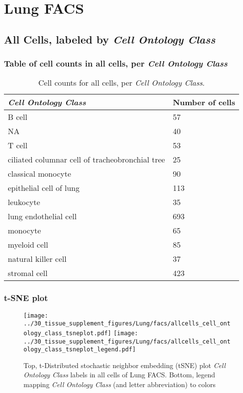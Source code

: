 \clearpage
\section{Lung FACS}

\subsection{All Cells, labeled by \emph{Cell Ontology Class}}
\subsubsection{Table of cell counts in all cells, per \emph{Cell Ontology Class}}\begin{table}[h]
\centering
\label{my-label}
\begin{tabular}{@{}ll@{}}
\toprule

\emph{Cell Ontology Class}& Number of cells \\ \midrule
B cell & 57 \\

NA & 40 \\

T cell & 53 \\

ciliated columnar cell of tracheobronchial tree & 25 \\

classical monocyte & 90 \\

epithelial cell of lung & 113 \\

leukocyte & 35 \\

lung endothelial cell & 693 \\

monocyte & 65 \\

myeloid cell & 85 \\

natural killer cell & 37 \\

stromal cell & 423 \\
\bottomrule
\end{tabular}
\caption{Cell counts for all cells, per \emph{Cell Ontology Class}.}
\end{table}

\clearpage
\subsubsection{t-SNE plot}
\begin{figure}[h]
\centering
\texttt{[image: ../30\_tissue\_supplement\_figures/Lung/facs/allcells\_cell\_ontology\_class\_tsneplot.pdf]}
\texttt{[image: ../30\_tissue\_supplement\_figures/Lung/facs/allcells\_cell\_ontology\_class\_tsneplot\_legend.pdf]}
\caption{Top, t-Distributed stochastic neighbor embedding (tSNE) plot  \emph{Cell Ontology Class} labels in all cells of Lung FACS. Bottom, legend mapping \emph{Cell Ontology Class} (and letter abbreviation) to colors}
\end{figure}


